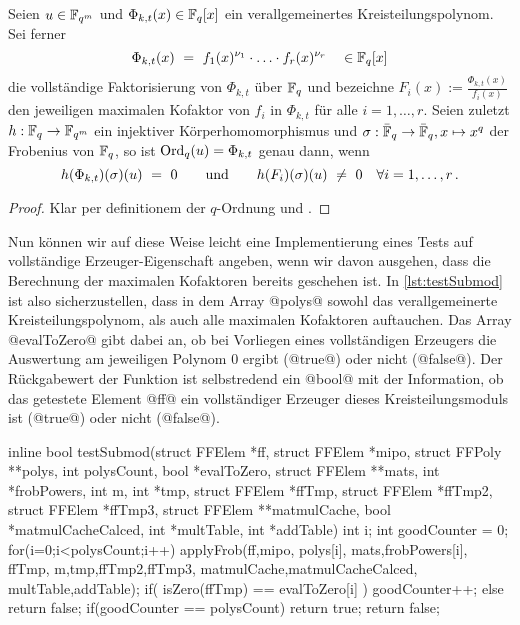 \begin{lemma}
  Seien $u\in \mathbb{F}_{q^m}$ und $\Phi_{k,t}(x) \in \mathbb{F}_q[x]$ ein verallgemeinertes
  Kreisteilungspolynom. Sei ferner
  \[ \Phi_{k,t}(x)  \ =\  f_1(x)^{\nu_1} \cdot \ldots \cdot
    f_r(x)^{\nu_r}\quad \in \mathbb{F}_q[x]\]
  die vollständige Faktorisierung von $\Phi_{k,t}$ über $\mathbb{F}_q$ und
  bezeichne $F_i(x) := \tfrac{\Phi_{k,t}(x)}{f_i(x)}$ den jeweiligen maximalen
  Kofaktor von $f_i$ in $\Phi_{k,t}$ für alle $i=1,\ldots,r$.
  Seien zuletzt $h: \mathbb{F}_q \to \mathbb{F}_{q^m}$ ein injektiver Körperhomomorphismus und 
  $\sigma:\bar {\mathbb{F}}_q \to \bar {\mathbb{F}}_q, x\mapsto x^q$ der Frobenius von $\mathbb{F}_q$, 
  so ist $\operatorname{Ord}_q(u) = \Phi_{k,t}$ genau dann, wenn
  \[h(\Phi_{k,t})(\sigma)(u) \ =\  0 
    \qquad\text{und}\qquad 
    h(F_i)(\sigma)(u) \ \neq\  0 \quad \forall i=1,\ldots,r \,.\]
\end{lemma}
\begin{proof}
  Klar per definitionem der $q$-Ordnung und .
\end{proof}


Nun können wir auf diese Weise leicht eine Implementierung eines Tests auf
vollständige Erzeuger-Eigenschaft angeben, wenn wir davon ausgehen, dass die
Berechnung der maximalen Kofaktoren bereits geschehen ist. In
\autoref{lst:testSubmod} ist also sicherzustellen, dass in dem Array
@polys@ sowohl das verallgemeinerte Kreisteilungspolynom, als auch alle 
maximalen Kofaktoren auftauchen. Das Array @evalToZero@ gibt dabei an, ob 
bei Vorliegen eines vollständigen Erzeugers die Auswertung am jeweiligen
Polynom $0$ ergibt (@true@) oder nicht (@false@). Der Rückgabewert der Funktion
ist selbstredend ein @bool@ mit der Information, ob das getestete Element @ff@
ein vollständiger Erzeuger dieses Kreisteilungsmoduls ist (@true@) oder nicht
(@false@).

\begin{ccode}[caption={Aus \url{../Sage/enumeratePCNs.c}},
  label=lst:testSubmod]
inline bool testSubmod(struct FFElem *ff, struct FFElem *mipo, 
        struct FFPoly **polys,
        int polysCount, bool *evalToZero, 
        struct FFElem **mats, int *frobPowers,
        int m, int *tmp, 
        struct FFElem *ffTmp, struct FFElem *ffTmp2, struct FFElem *ffTmp3, 
        struct FFElem **matmulCache, bool *matmulCacheCalced,
        int *multTable, int *addTable){
    int i;
    int goodCounter = 0;
    for(i=0;i<polysCount;i++){
        applyFrob(ff,mipo,
                polys[i],
                mats,frobPowers[i], ffTmp,
                m,tmp,ffTmp2,ffTmp3,
                matmulCache,matmulCacheCalced,
                multTable,addTable);
        if( isZero(ffTmp) == evalToZero[i] ){
            goodCounter++;
        }else{
            return false;
        }
    }
    if(goodCounter == polysCount){
        return true;
    }
    return false;
}
\end{ccode}


